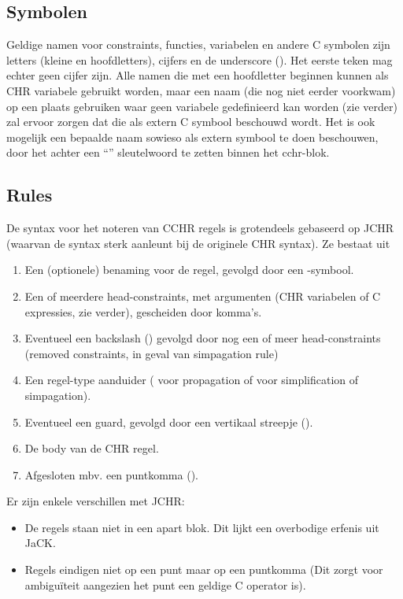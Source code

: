 \subsection{Symbolen}

Geldige namen voor constraints, functies, variabelen en andere C symbolen zijn letters (kleine en hoofdletters), cijfers en de underscore (\code{\_}). Het eerste teken mag echter geen cijfer zijn. Alle namen die met een hoofdletter beginnen kunnen als CHR variabele gebruikt worden, maar een naam (die nog niet eerder voorkwam) op een plaats gebruiken waar geen variabele gedefinieerd kan worden (zie verder) zal ervoor zorgen dat die als extern C symbool beschouwd wordt. Het is ook mogelijk een bepaalde naam sowieso als extern symbool te doen beschouwen, door het achter een ``'' sleutelwoord te zetten binnen het cchr-blok.

\subsection{Rules}

De syntax voor het noteren van CCHR regels is grotendeels gebaseerd op JCHR (waarvan de syntax sterk aanleunt bij de
originele CHR syntax). Ze bestaat uit \begin{enumerate}
  \item Een (optionele) benaming voor de regel, gevolgd door een -symbool.
  \item Een of meerdere head-constraints, met argumenten (CHR variabelen of C expressies, zie verder), gescheiden door komma's.
  \item Eventueel een backslash (\code{$\backslash$}) gevolgd door nog een of meer head-constraints (removed constraints, in geval van simpagation rule)
  \item Een regel-type aanduider (\code{==>} voor propagation of \code{<=>} voor simplification of simpagation).
  \item Eventueel een guard, gevolgd door een vertikaal streepje (\code{|}).
  \item De body van de CHR regel.
  \item Afgesloten mbv. een puntkomma (\code{;}).
\end{enumerate}

Er zijn enkele verschillen met JCHR: \begin{itemize}
  \item De regels staan niet in een apart  blok. Dit lijkt een overbodige erfenis uit JaCK.
  \item Regels eindigen niet op een punt maar op een puntkomma (Dit zorgt voor ambigu\"iteit aangezien het punt een geldige
        C operator is).
\end{itemize}


